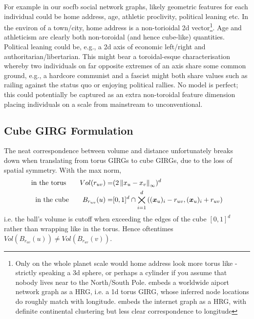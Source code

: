 For example in our socfb social network graphs, likely geometric features for each individual could be home address, age, athletic proclivity, political leaning etc.
In the environ of a town/city, home address is a non-torioidal 2d vector\footnote{Only on the whole planet scale would home address look more torus like - strictly speaking a 3d sphere, or perhaps a cylinder if you assume that nobody lives near to the North/South Pole. \cite{garcia2019mercator} embeds a worldwide aiport network graph as a HRG, i.e. a 1d torus GIRG, whose inferred node locations do roughly match with longitude. \cite{boguna2010sustaining} embeds the internet graph as a HRG, with definite continental clustering but less clear correspondence to longitude}.
Age and athleticism are clearly both non-toroidal (and hence cube-like) quantities.
Political leaning could be, e.g., a 2d axis of economic left/right and authoritarian/libertarian.
This might bear a toroidal-esque characterisation whereby two individuals on far opposite extremes of an axis share some common ground, e.g., a hardcore communist and a fascist might both share values such as railing against the status quo or enjoying political rallies.
No model is perfect; this could potentially be captured as an extra non-toroidal feature dimension placing individuals on a scale from mainstream to unconventional.

\subsection{Cube GIRG Formulation}
The neat correspondence between volume and distance unfortunately breaks down when translating from torus GIRGs to cube GIRGs, due to the loss of spatial symmetry.
With the max norm,
\begin{align}
\text{in the torus} \quad \quad Vol(r_{uv}) =& (2 \left\lVert x_u - x_v\right\rVert_\infty)^d
\\
\text{in the cube} \quad \quad B_{r_{uv}}(u) =& [0, 1]^d \cap \bigtimes_{i=1}^d 
    \left ( (\bm{x}_{u})_{i} - r_{uv}, (\bm{x}_{u})_{i} + r_{uv} \right ) 
\end{align}
i.e. the ball's volume is cutoff when exceeding the edges of the cube $[0,1]^d$ rather than wrapping like in the torus. Hence oftentimes $Vol(B_{r_{uv}}(u)) \neq Vol(B_{r_{uv}}(v))$. 

